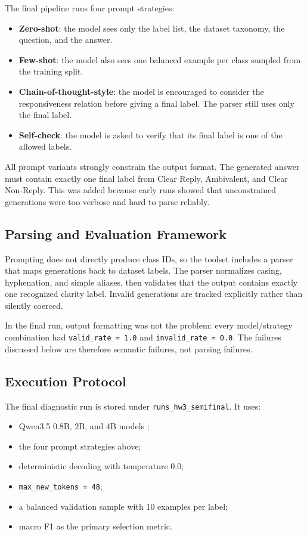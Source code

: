\documentclass[12pt]{fphw}
\newcommand{\CR}{Clear Reply}
\newcommand{\AMB}{Ambivalent}
\newcommand{\CNR}{Clear Non-Reply}
\begin{document}
The final pipeline runs four prompt strategies:
\begin{itemize}
    \item \textbf{Zero-shot}: the model sees only the label list, the dataset taxonomy, the question, and the answer.
    \item \textbf{Few-shot}: the model also sees one balanced example per class sampled from the training split.
    \item \textbf{Chain-of-thought-style}: the model is encouraged to consider the responsiveness relation before giving a final label. The parser still uses only the final label.
    \item \textbf{Self-check}: the model is asked to verify that its final label is one of the allowed labels.
\end{itemize}

All prompt variants strongly constrain the output format. The generated answer must contain exactly one final label from \CR, \AMB, and \CNR. This was added because early runs showed that unconstrained generations were too verbose and hard to parse reliably.

\subsection{Parsing and Evaluation Framework}

Prompting does not directly produce class IDs, so the toolset includes a parser that maps generations back to dataset labels. The parser normalizes casing, hyphenation, and simple aliases, then validates that the output contains exactly one recognized clarity label. Invalid generations are tracked explicitly rather than silently coerced.

In the final run, output formatting was not the problem: every model/strategy combination had \texttt{valid\_rate = 1.0} and \texttt{invalid\_rate = 0.0}. The failures discussed below are therefore semantic failures, not parsing failures.

\subsection{Execution Protocol}

The final diagnostic run is stored under \texttt{runs\_hw3\_semifinal}. It uses:
\begin{itemize}
    \item Qwen3.5 0.8B, 2B, and 4B models \cite{qwen};
    \item the four prompt strategies above;
    \item deterministic decoding with temperature 0.0;
    \item \texttt{max\_new\_tokens = 48};
    \item a balanced validation sample with 10 examples per label;
    \item macro F1 as the primary selection metric.
\end{itemize}
\end{document}
